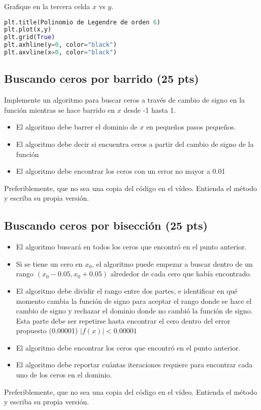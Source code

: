 \documentclass{article}
\begin{document}
Grafique en la tercera celda $x$ vs $y$.
\begin{lstlisting}[language=Python]
plt.title(Polinomio de Legendre de orden 6)
plt.plot(x,y)
plt.grid(True)
plt.axhline(y=0, color="black")
plt.axvline(x=0, color="black")
\end{lstlisting}

\subsection{Buscando ceros por barrido (25 pts)}
Implemente un algoritmo para buscar ceros a través de cambio de signo
en la función mientras se hace barrido en $x$ desde -1 hasta 1.

\begin{itemize}
\item El algoritmo debe barrer el dominio de $x$ en pequeños pasos pequeños.
\item El algoritmo debe decir si encuentra ceros a partir del cambio de
  signo de la función
\item El algoritmo debe encontrar los ceros con un error no mayor a 0.01
\end{itemize}
Preferiblemente, que no sea una copia del código en el vídeo. Entienda
el método y escriba su propia versión.

\subsection{Buscando ceros por bisección (25 pts)}
\begin{itemize}
\item El algoritmo buscará en todos los ceros que encontró en el punto anterior.
\item Si se tiene un cero en $x_0$, el algoritmo  puede empezar a buscar
  dentro de un rango $(x_0 - 0.05 , x_0 + 0.05)$
  alrededor de cada cero que había encontrado.
\item El algoritmo debe dividir el rango entre dos partes, e identificar
  en qué momento cambia la función de signo para aceptar el rango
  donde se hace el cambio de signo y rechazar el dominio donde no
  cambió la función de signo. Esta parte debe ser repetirse hasta
  encontrar el cero dentro del error propuesto (0.00001)
  $|f(x)| < 0.00001$
\item El algoritmo debe encontrar los ceros que encontró en el punto
  anterior.
\item El algoritmo debe reportar cuántas iteraciones requiere para
  encontrar cada uno de los ceros en el dominio.
\end{itemize}
Preferiblemente, que no sea una copia del código en el vídeo. Entienda
el método y escriba su propia versión.
\end{document}
